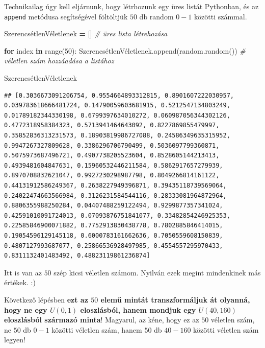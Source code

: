 \documentclass[
]{book}
\newenvironment{Shaded}{\begin{snugshade}}{\end{snugshade}}
\newcommand{\BuiltInTok}[1]{#1}
\newcommand{\CommentTok}[1]{\textcolor[rgb]{0.56,0.35,0.01}{\textit{#1}}}
\newcommand{\ControlFlowTok}[1]{\textcolor[rgb]{0.13,0.29,0.53}{\textbf{#1}}}
\newcommand{\DecValTok}[1]{\textcolor[rgb]{0.00,0.00,0.81}{#1}}
\newcommand{\KeywordTok}[1]{\textcolor[rgb]{0.13,0.29,0.53}{\textbf{#1}}}
\newcommand{\NormalTok}[1]{#1}
\newcommand{\OperatorTok}[1]{\textcolor[rgb]{0.81,0.36,0.00}{\textbf{#1}}}
\begin{document}
Technikailag úgy kell eljárnunk, hogy létrhozunk egy üres listát Pythonban, és az \texttt{append} metódusa segítségével föltöltjük \(50\) db random \(0-1\) közötti számmal.

\begin{Shaded}
\begin{Highlighting}[]
\NormalTok{SzerencsétlenVéletlenek }\OperatorTok{=}\NormalTok{ [] }\CommentTok{\# üres lista létrehozása}

\ControlFlowTok{for}\NormalTok{ index }\KeywordTok{in} \BuiltInTok{range}\NormalTok{(}\DecValTok{50}\NormalTok{):}
\NormalTok{  SzerencsétlenVéletlenek.append(random.random()) }\CommentTok{\# véletlen szám hozzáadása a listához}

\NormalTok{SzerencsétlenVéletlenek}
\end{Highlighting}
\end{Shaded}

\begin{verbatim}
## [0.3036673091206754, 0.9554664893312815, 0.8901607222030957, 0.039783618666481724, 0.14790059603681915, 0.5212547134803249, 0.01789182344330198, 0.6799397634010272, 0.060987056344302126, 0.4772318958384323, 0.5713941464643092, 0.8227869855479997, 0.35852836313231573, 0.18903819986727088, 0.24586349635315952, 0.9947267327809628, 0.3386296706790499, 0.5036097799360871, 0.5075973687496721, 0.4907738205523604, 0.8528605144213413, 0.4939481604847631, 0.15960532446211584, 0.5862917657279939, 0.8970708832621047, 0.9927230298987798, 0.8049266814161122, 0.44131912586249367, 0.2638227949396871, 0.39435118739569064, 0.24022474663566984, 0.3126231584544116, 0.28333081964872964, 0.8806355988250284, 0.04407488259122494, 0.9299877357341024, 0.42591010091724013, 0.07093876751841077, 0.33482854246925353, 0.22585846900071882, 0.7752913830438778, 0.7802885846414015, 0.19054596129145118, 0.6000783161662636, 0.7050559608150839, 0.4807127993687077, 0.25866536928497985, 0.4554557295970433, 0.8311132401483492, 0.48823119861236874]
\end{verbatim}

Itt is van az \(50\) szép kicsi véletlen számom. Nyilván ezek megint mindenkinek más értékek. :)

Következő lépésben \textbf{ezt az \(50\) elemű mintát transzformáljuk át olyanná, hogy ne egy \(U(0,1)\) eloszlásból, hanem mondjuk egy \(U(40,160)\) eloszlásból származó minta}! Magyarul, az kéne, hogy ez az \(50\) véletlen szám, ne \(50\) db \(0-1\) közötti véletlen szám, hanem \(50\) db \(40-160\) közötti véletlen szám legyen!
\end{document}
